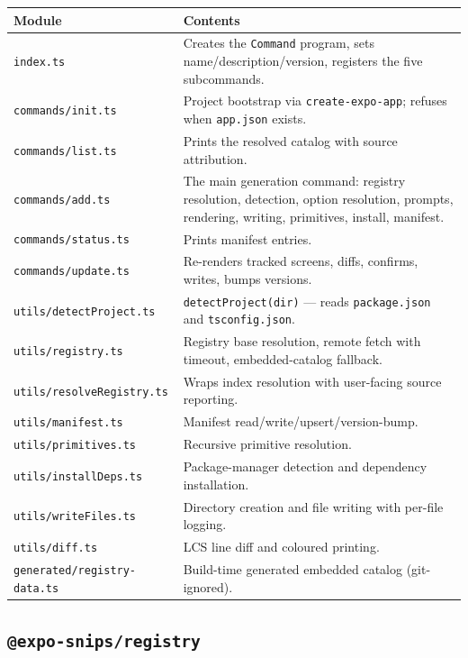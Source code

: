 \begin{longtable}{@{}L{4.2cm}L{9.8cm}@{}}
\toprule
\textbf{Module} & \textbf{Contents} \\
\midrule
\endhead
\texttt{index.ts} & Creates the \texttt{Command} program, sets name/description/version, registers the five subcommands. \\
\texttt{commands/init.ts} & Project bootstrap via \texttt{create-expo-app}; refuses when \texttt{app.json} exists. \\
\texttt{commands/list.ts} & Prints the resolved catalog with source attribution. \\
\texttt{commands/add.ts} & The main generation command: registry resolution, detection, option resolution, prompts, rendering, writing, primitives, install, manifest. \\
\texttt{commands/status.ts} & Prints manifest entries. \\
\texttt{commands/update.ts} & Re-renders tracked screens, diffs, confirms, writes, bumps versions. \\
\texttt{utils/detectProject.ts} & \texttt{detectProject(dir)} --- reads \texttt{package.json} and \texttt{tsconfig.json}. \\
\texttt{utils/registry.ts} & Registry base resolution, remote fetch with timeout, embedded-catalog fallback. \\
\texttt{utils/resolveRegistry.ts} & Wraps index resolution with user-facing source reporting. \\
\texttt{utils/manifest.ts} & Manifest read/write/upsert/version-bump. \\
\texttt{utils/primitives.ts} & Recursive primitive resolution. \\
\texttt{utils/installDeps.ts} & Package-manager detection and dependency installation. \\
\texttt{utils/writeFiles.ts} & Directory creation and file writing with per-file logging. \\
\texttt{utils/diff.ts} & LCS line diff and coloured printing. \\
\texttt{generated/registry-data.ts} & Build-time generated embedded catalog (git-ignored). \\
\bottomrule
\end{longtable}

\subsection*{\texttt{@expo-snips/registry}}

